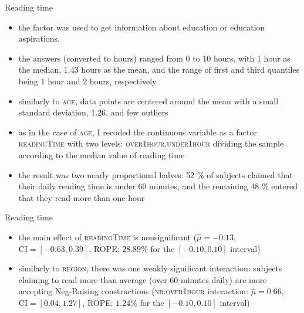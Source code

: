 \documentclass[
  ignorenonframetext,
]{beamer}
\providecommand{\tightlist}{%
  \setlength{\itemsep}{0pt}\setlength{\parskip}{0pt}}\usepackage{longtable,booktabs,array}
\begin{document}
\begin{frame}
\begin{block}{Reading time}
\protect\hypertarget{reading-time}{}
\begin{itemize}
\tightlist
\item
  the factor was used to get information about education or education
  aspirations.
\item
  the answers (converted to hours) ranged from 0 to 10 hours, with 1
  hour as the median, 1.43 hours as the mean, and the range of first and
  third quantiles being 1 hour and 2 hours, respectively
\item
  similarly to \textsc{age}, data points are centered around the mean
  with a small standard deviation, 1.26, and few outliers
\item
  as in the case of \textsc{age}, I recoded the continuous variable as a
  factor \textsc{readingTime} with two levels:
  \textsc{over1hour,under1hour} dividing the sample according to the
  median value of reading time
\item
  the result was two nearly proportional halves: 52 \% of subjects
  claimed that their daily reading time is under 60 minutes, and the
  remaining 48 \% entered that they read more than one hour
\end{itemize}
\end{block}
\end{frame}

\begin{frame}
\begin{block}{Reading time}
\protect\hypertarget{reading-time-1}{}
\begin{itemize}
\tightlist
\item
  the main effect of \textsc{readingTime} is nonsignificant
  (\(\hat{\mu}=-0.13\), \(\mathrm{CI}=[-0.63, 0.39]\), ROPE: \(28.89\%\)
  for the \([-0.10, 0.10]\) interval)
\item
  similarly to \textsc{region}, there was one weakly significant
  interaction: subjects claiming to read more than average (over 60
  minutes daily) are more accepting Neg-Raising constructions
  (\textsc{nr:over1hour} interaction: \(\hat{\mu}=0.66\),
  \(\mathrm{CI}=[ 0.04, 1.27]\), ROPE: \(1.24\%\) for the
  \([-0.10, 0.10]\) interval)
\end{itemize}
\end{block}
\end{frame}
\end{document}
